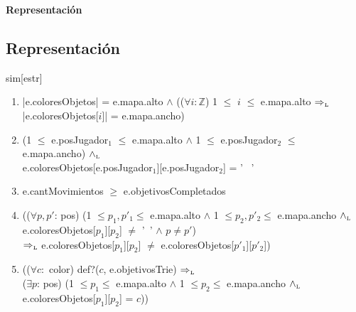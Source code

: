 \documentclass[a4paper,10pt]{article}
\newenvironment{Representacion}{%
  \vspace*{2ex}%
  \noindent\textbf{\Large Representación}%
  \vspace*{2ex}%
}{}
\begin{document}
\begin{Representacion}

\subsection{Representación} 

\begin{Estructura}{sim}[estr]
    \begin{Tupla}[estr]%
    \end{Tupla}
  \end{Estructura}


  \begin{enumerate}
      \item |e.coloresObjetos| = e.mapa.alto $\land$ (($\forall i: \mathbb Z$) 1 $\leq$ $i$ $\leq$ e.mapa.alto $\Rightarrow_{\mathrm{\scriptscriptstyle{L}}}$  |e.coloresObjetos[$i$]| = e.mapa.ancho)
      
      \item (1 $\leq$ e.posJugador$_{1}$ $\leq$ e.mapa.alto $\land$ 1 $\leq$ e.posJugador$_{2}$ $\leq$ e.mapa.ancho) $\land_{\mathrm{\scriptscriptstyle{L}}}$ \\ 
      e.coloresObjetos[e.posJugador$_{1}$][e.posJugador$_{2}$] = ' \ '
      
      \item e.cantMovimientos $\geq$ e.objetivosCompletados
        
      \item (($\forall p, p'$: pos) (1 $\leq p_{1}, p'_{1} \leq$ e.mapa.alto $\land$ 1 $\leq p_{2}, p'_{2} \leq$ e.mapa.ancho $\land_{\mathrm{\scriptscriptstyle{L}}}$ e.coloresObjetos[$p_{1}$][$p_{2}$] $\neq$ '\ ' $\land$ $p \neq p'$) \\
      $\Rightarrow_{\mathrm{\scriptscriptstyle{L}}}$ e.coloresObjetos[$p_{1}$][$p_{2}$] $\neq$ e.coloresObjetos[$p'_{1}$][$p'_{2}$])
      
      \item (($\forall c:$ color) def?($c$, e.objetivosTrie) $\Rightarrow_{\mathrm{\scriptscriptstyle{L}}}$ \\
      ($\exists p$: pos) (1 $\leq p_{1} \leq$ e.mapa.alto $\land$ 1 $\leq p_{2} \leq$ e.mapa.ancho $\land_{\mathrm{\scriptscriptstyle{L}}}$ e.coloresObjetos[$p_{1}$][$p_{2}$] = $c$)) 
      

\end{enumerate}
\end{Representacion}
\end{document}
